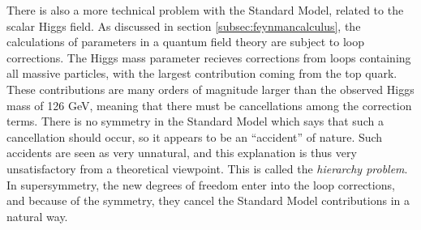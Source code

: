 \documentclass[twoside,english]{uiofysmaster}
\begin{document}
There is also a more technical problem with the Standard Model, related to the scalar Higgs field. As discussed in section \ref{subsec:feynmancalculus}, the calculations of parameters in a quantum field theory are subject to loop corrections. The Higgs mass parameter recieves corrections from loops containing all massive particles, with the largest contribution coming from the top quark. These contributions are many orders of magnitude larger than the observed Higgs mass of 126 GeV, meaning that there must be cancellations among the correction terms. There is no symmetry in the Standard Model which says that such a cancellation should occur, so it appears to be an ``accident'' of nature. Such accidents are seen as very unnatural, and this explanation is thus very unsatisfactory from a theoretical viewpoint. This is called the {\it hierarchy problem}. In supersymmetry, the new degrees of freedom enter into the loop corrections, and because of the symmetry, they cancel the Standard Model contributions in a natural way. 






\end{document}
